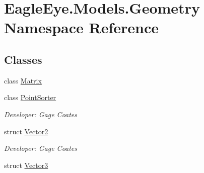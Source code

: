 \hypertarget{namespace_eagle_eye_1_1_models_1_1_geometry}{}\section{Eagle\+Eye.\+Models.\+Geometry Namespace Reference}
\label{namespace_eagle_eye_1_1_models_1_1_geometry}
\subsection*{Classes}
\begin{DoxyCompactItemize}
\item 
class \mbox{\hyperlink{class_eagle_eye_1_1_models_1_1_geometry_1_1_matrix}{Matrix}}
\item 
class \mbox{\hyperlink{class_eagle_eye_1_1_models_1_1_geometry_1_1_point_sorter}{Point\+Sorter}}
\begin{DoxyCompactList}\small\item\em Developer\+: Gage Coates \end{DoxyCompactList}\item 
struct \mbox{\hyperlink{struct_eagle_eye_1_1_models_1_1_geometry_1_1_vector2}{Vector2}}
\begin{DoxyCompactList}\small\item\em Developer\+: Gage Coates \end{DoxyCompactList}\item 
struct \mbox{\hyperlink{struct_eagle_eye_1_1_models_1_1_geometry_1_1_vector3}{Vector3}}
\end{DoxyCompactItemize}
